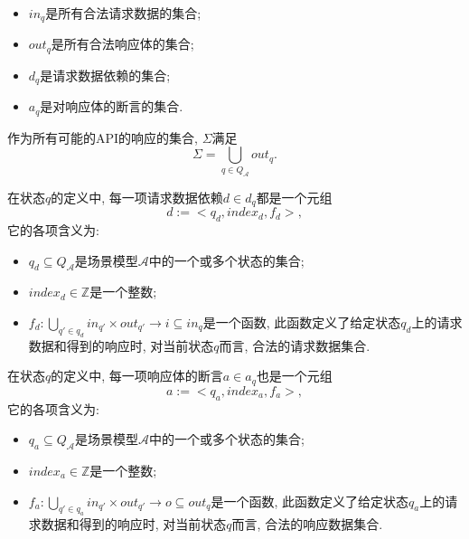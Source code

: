 \begin{definition}
\begin{itemize}
                    \item $in_q$是所有合法请求数据的集合;
                    
                    \item $out_q$是所有合法响应体的集合;
                    
                    \item $d_q$是请求数据依赖的集合;
                    
                    \item $a_q$是对响应体的断言的集合.
                \end{itemize}
                
                作为所有可能的API的响应的集合, $\Sigma$满足
                \begin{equation}
                    \Sigma = \bigcup_{q \in Q_{\mathcal{A}}} out_q.
                \end{equation}
                
                在状态$q$的定义中, 每一项请求数据依赖$d \in d_q$都是一个元组
                \begin{equation}
                    d := <q_d, index_d, f_d>,
                \end{equation}
                它的各项含义为:
                \begin{itemize}
                    \item $q_d \subseteq Q_{\mathcal{A}}$是场景模型$\mathcal{A}$中的一个或多个状态的集合;
                    
                    \item $index_d \in \mathbb{Z}$是一个整数;
                    
                    \item $f_d: \bigcup_{q' \in q_d} in_{q'} \times out_{q'} \to i \subseteq in_q$是一个函数, 此函数定义了给定状态$q_d$上的请求数据和得到的响应时, 对当前状态$q$而言, 合法的请求数据集合.
                \end{itemize}
                
                在状态$q$的定义中, 每一项响应体的断言$a \in a_q$也是一个元组
                \begin{equation}
                    a := <q_a, index_a, f_a>,
                \end{equation}
                它的各项含义为:
                \begin{itemize}
                    \item $q_a \subseteq Q_{\mathcal{A}}$是场景模型$\mathcal{A}$中的一个或多个状态的集合;
                    
                    \item $index_a \in \mathbb{Z}$是一个整数;
                    
                    \item $f_a: \bigcup_{q' \in q_a} in_{q'} \times out_{q'} \to o \subseteq out_q$是一个函数, 此函数定义了给定状态$q_a$上的请求数据和得到的响应时, 对当前状态$q$而言, 合法的响应数据集合.
                \end{itemize}
            \end{definition}
            
